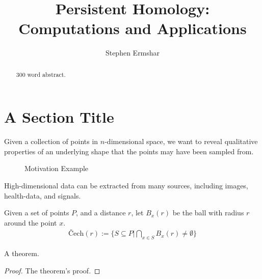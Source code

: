

\title{Persistent Homology: Computations and Applications}
\author{Stephen Ermshar}



\begin{abstract}
    300 word abstract.
\end{abstract}
\maketitle

\section{A Section Title}

Given a collection of points in \(n\)-dimensional space, we want to reveal qualitative properties of an underlying shape that the points may have been sampled from.

\begin{figure}[h!]
    \centering
    
    \caption{Motivation Example}
\end{figure}

High-dimensional data can be extracted from many sources, including images, health-data, and signals.

\begin{definition}\label{cechc}
    Given a set of points \(P\), and a distance \(r\), let \(B_x(r)\) be the ball with radius \(r\) around the point \(x\).
    \begin{align*}
        \textrm{\v{C}ech}(r) := \{ S \subseteq P | \bigcap_{x\in S} B_x(r) \neq \emptyset \}
    \end{align*}
    \cite{wagner}
\end{definition}

\begin{theorem}\label{obvious}
    A theorem.
\end{theorem}

\begin{proof}
    The theorem's proof.
\end{proof}

\newpage






